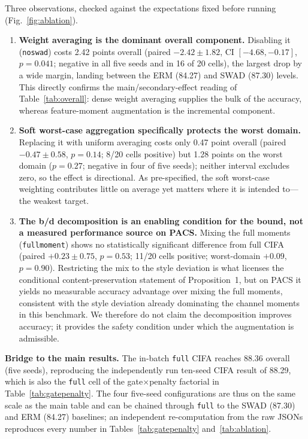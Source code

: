 \documentclass[electronics,article,submit,moreauthors]{Definitions/mdpi}
\newcommand{\add}[1]{\textcolor{addblue}{#1}}
\newcommand{\del}[1]{\textcolor{delred}{\st{#1}}}
\def\add#1{#1}
\def\del#1{}
\begin{document}
Three observations, checked against the expectations fixed before running (Fig.~\ref{fig:ablation}).
\begin{enumerate}
\item \textbf{Weight averaging is the dominant overall component.} Disabling it (\texttt{noswad}) costs 2.42 points overall (paired $-2.42\pm1.82$, CI $[-4.68,-0.17]$, $p=0.041$; negative in all five seeds and in 16 of 20 cells), the largest drop by a wide margin, landing between the ERM (84.27) and SWAD (87.30) levels. This directly confirms the main/secondary-effect reading of Table~\ref{tab:overall}: dense weight averaging supplies the bulk of the accuracy, whereas feature-moment augmentation is the incremental component.
\item \textbf{Soft worst-case aggregation specifically protects the worst domain.} Replacing it with uniform averaging costs only 0.47 point overall (paired $-0.47\pm0.58$, $p=0.14$; 8/20 cells positive) but 1.28 points on the worst domain ($p=0.27$; negative in four of five seeds); neither interval excludes zero, so the effect is directional. As pre-specified, the soft worst-case weighting contributes little on average yet matters where it is intended to---the weakest target.
\item \textbf{The b/d decomposition is an enabling condition for the bound, not a measured performance source on PACS.} Mixing the full moments (\texttt{fullmoment}) \del{is statistically indistinguishable from}\add{shows no statistically significant difference from} full CIFA (paired $+0.23\pm0.75$, $p=0.53$; 11/20 cells positive; worst-domain $+0.09$, $p=0.90$). Restricting the mix to the style deviation is what \del{licenses the content-preservation claim}\add{licenses the conditional content-preservation statement} of Proposition~1, but on PACS it yields no measurable accuracy advantage over mixing the full moments, consistent with the style deviation already dominating the channel moments in this benchmark. We therefore do not claim the decomposition improves accuracy; it provides the safety condition under which the augmentation is admissible.
\end{enumerate}

\textbf{Bridge to the main results.} The in-batch \texttt{full} CIFA reaches 88.36 overall (five seeds), reproducing the independently run ten-seed CIFA result of 88.29, which is also the \texttt{full} cell of the gate$\times$penalty factorial in Table~\ref{tab:gatepenalty}. The four five-seed configurations are thus on the same scale as the main table and can be chained through \texttt{full} to the SWAD (87.30) and ERM (84.27) baselines; an independent re-computation from the raw JSONs reproduces every number in Tables~\ref{tab:gatepenalty} and~\ref{tab:ablation}.
\end{document}
